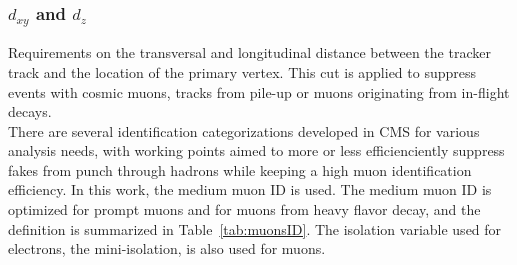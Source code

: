 \subsubsection*{$d_{xy}$ and $d_{z}$}
\noindent\justify
Requirements on the transversal and longitudinal distance between the tracker track and the location of the primary vertex. 
This cut is applied to suppress events with cosmic muons, tracks from pile-up or muons originating from in-flight decays.
\\
There are several identification categorizations developed in CMS for various analysis needs, with working points aimed to more or less efficienciently suppress fakes from punch through hadrons while keeping a high muon identification efficiency.
In this work, the medium muon ID is used. The medium muon ID is optimized for prompt muons and for muons from heavy flavor decay, and the definition is summarized in Table~\ref{tab:muonsID}. 
The isolation variable used for electrons, the mini-isolation, is also used for muons. 
